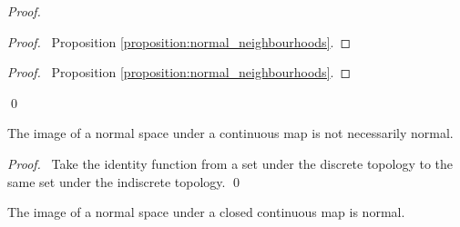 \begin{proof}
    \pf
    \begin{proof}
        \pf\ Proposition \ref{proposition:normal_neighbourhoods}.
    \end{proof}
    \begin{proof}
        \pf\ Proposition \ref{proposition:normal_neighbourhoods}.
    \end{proof}
    \qed
\end{proof}

\begin{proposition}
    The image of a normal space under a continuous map is
    not necessarily normal.
\end{proposition}

\begin{proof}
    \pf\ Take the identity function from a set under the
    discrete topology to the same set under the indiscrete topology. \qed
\end{proof}

\begin{proposition}
    \label{proposition:closed_continuous_image_normal}
    The image of a normal space under a closed continuous map is normal.
\end{proposition}

